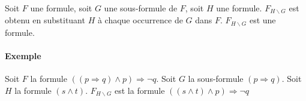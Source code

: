 \documentclass[11pt,twoside,openright,a4paper]{report}
\begin{document}
Soit $F$ une formule, soit $G$ une sous-formule de $F$, soit $H$ une formule. $F_{H\backslash G}$ est obtenu en substituant $H$ à chaque occurrence de $G$ dans $F$. $F_{H\backslash G}$ est une formule.


\paragraph{Exemple} %
\label{par:exemple}

Soit $F$ la formule $(( p \Rightarrow q ) \land p ) \Rightarrow \neg q$. Soit $G$ la sous-formule $(p \Rightarrow q)$. Soit $H$ la formule $(s \land t)$. $F_{H \backslash G}$ est la formule $(( s \land t ) \land p ) \Rightarrow \neg q$


\end{document}
